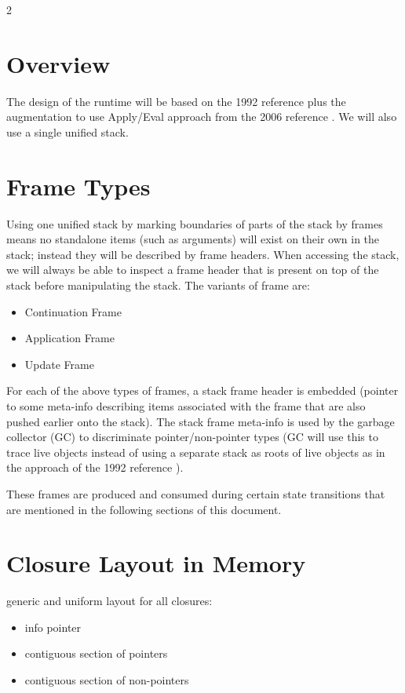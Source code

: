 \documentclass[8pt]{extarticle}
\begin{document}
  
\begin{multicols*}{2}

  \section{Overview}

  The design of the runtime will be based on the 1992 reference \cite{peyton1992} plus the augmentation to use Apply/Eval approach from the 2006 reference \cite{marlow2006}. We will also use a single unified stack.

  \section{Frame Types}
  
  Using one unified stack by marking boundaries of parts of the stack by frames means no standalone items (such as arguments) will exist on their own in the stack; instead they will be described by frame headers. When accessing the stack, we will always be able to inspect a frame header that is present on top of the stack before manipulating the stack. The variants of frame are:

  \begin{itemize}
  \item Continuation Frame
  \item Application Frame
  \item Update Frame
  \end{itemize}

  For each of the above types of frames, a stack frame header is embedded (pointer to some meta-info describing items associated with the frame that are also pushed earlier onto the stack). The stack frame meta-info is used by the garbage collector (GC) to discriminate pointer/non-pointer types (GC will use this to trace live objects instead of using a separate stack as roots of live objects as in the approach of the 1992 reference \cite{peyton1992}).

  These frames are produced and consumed during certain state transitions that are mentioned in the following sections of this document.

  \section{Closure Layout in Memory}

  generic and uniform layout for all closures:
  \begin{itemize}
  \item info pointer
  \item contiguous section of pointers
  \item contiguous section of non-pointers
  \end{itemize}
  

\end{multicols*}
\end{document}
